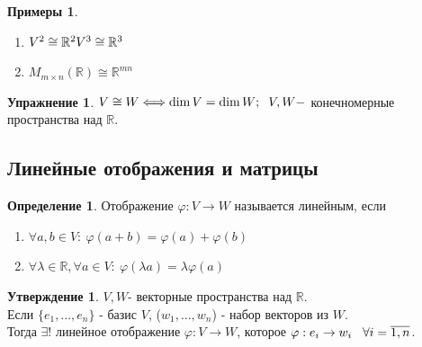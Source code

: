 \documentclass[a4paper, 12pt]{article}
\newcommand{\R}{\mathbb R}
\renewcommand{\phi}{\varphi}
\newcommand\tab[1][.5cm]{\hspace*{#1}}
\theoremstyle{definition}
\newtheorem*{definition}{Определение}
\newtheorem*{subtheorem}{Утверждение}
\newtheorem*{example}{Примеры}
\newtheorem*{Exercise}{Упражнение}
\begin{document}
  \begin{example}\end{example}
  \begin{enumerate}
    \item $V^2 \cong \R^2 \\ V^3 \cong \R^3$ 
    \item $M_{m \times n}(\R) \cong \R^{mn}$
  \end{enumerate}
  \begin{Exercise}
    $V \cong W \Longleftrightarrow \dim V = \dim W; \tab[0.2cm] V,W - $ конечномерные пространства над $\R$.  
  \end{Exercise}
  \subsection{Линейные отображения и матрицы}
  \begin{definition}
    Отображение $\phi: V \to W$ называется линейным, если
    \begin{enumerate}
      \item $\forall a,b \in V: \ \phi(a+b) = \phi(a) + \phi(b)$
      \item $\forall \lambda \in \R, \forall a \in V: \  \phi(\lambda a) = \lambda \phi(a)$  
    \end{enumerate}
    
  \end{definition} 
  \begin{subtheorem}
    $V,W$- векторные пространства над $\R$. \\
      Если $\{e_1,...,e_n\}$ - базис $V$, ($w_1,...,w_n$) - набор векторов из $W$. \\Тогда $\exists$! линейное отображение $\phi: V \to W$, которое $\phi: e_i \to w_i \tab[0.3cm]\forall i = \overline{1,n}$.
  \end{subtheorem} 
\end{document}
